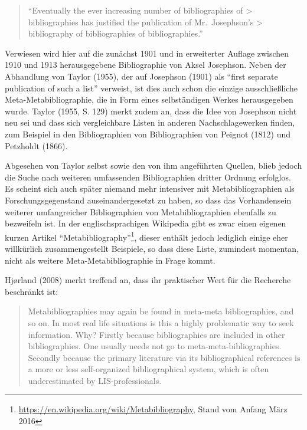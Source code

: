 \documentclass[a4paper,
fontsize=11pt,
oneside,
numbers=noperiodatend,
parskip=half-,
bibliography=totoc,
final
]{scrartcl}
\begin{document}
\begin{quote}
\enquote{Eventually the ever increasing number of bibliographies of
\textgreater{} bibliographies has justified the publication of
Mr.~Josephson's \textgreater{} bibliography of bibliographies of
bibliographies.}
\end{quote}

Verwiesen wird hier auf die zunächst 1901 und in erweiterter Auflage
zwischen 1910 und 1913 herausgegebene Bibliographie von Aksel Josephson.
Neben der Abhandlung von Taylor (1955), der auf Josephson (1901) als
\enquote{first separate publication of such a list} verweist, ist dies
auch schon die einzige ausschließliche Meta-Metabibliographie, die in
Form eines selbständigen Werkes herausgegeben wurde. Taylor (1955, S.
129) merkt zudem an, dass die Idee von Josephson nicht neu sei und dass
sich vergleichbare Listen in anderen Nachschlagewerken finden, zum
Beispiel in den Bibliographien von Bibliographien von Peignot (1812) und
Petzholdt (1866).

Abgesehen von Taylor selbst sowie den von ihm angeführten Quellen, blieb
jedoch die Suche nach weiteren umfassenden Bibliographien dritter
Ordnung erfolglos. Es scheint sich auch später niemand mehr intensiver
mit Metabibliographien als Forschungsgegenstand auseinandergesetzt zu
haben, so dass das Vorhandensein weiterer umfangreicher Bibliographien
von Metabibliographien ebenfalls zu bezweifeln ist. In der
englischsprachigen Wikipedia gibt es zwar einen eigenen kurzen Artikel
\enquote{Metabibliography}\footnote{\url{https://en.wikipedia.org/wiki/Metabibliography},
  Stand vom Anfang März 2016}, dieser enthält jedoch lediglich einige
eher willkürlich zusammengestellt Beispiele, so dass diese Liste,
zumindest momentan, nicht als weitere Meta-Metabibliographie in Frage
kommt.

Hjørland (2008) merkt treffend an, dass ihr praktischer Wert für die
Recherche beschränkt ist:

\begin{quote}
Metabibliographies may again be found in meta-meta bibliographies, and
so on. In most real life situations is this a highly problematic way to
seek information. Why? Firstly because bibliographies are included in
other bibliographies. One usually needs not go to
meta-meta-bibliographies. Secondly because the primary literature via
its bibliographical references is a more or less self-organized
bibliographical system, which is often underestimated by
LIS-professionals.
\end{quote}
\end{document}
